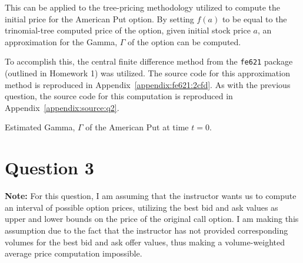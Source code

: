 \documentclass[10pt]{article}
\begin{document}
This can be applied to the tree-pricing methodology utilized to compute the initial price for the American Put option. By setting $f(a)$ to be equal to the trinomial-tree computed price of the option, given initial stock price $a$, an approximation for the Gamma, $\Gamma$ of the option can be computed.

To accomplish this, the central finite difference method from the \texttt{fe621} package (outlined in Homework 1) was utilized. The source code for this approximation method is reproduced in Appendix~\ref{appendix:fe621:2cfd}. As with the previous question, the source code for this computation is reproduced in Appendix~\ref{appendix:source:q2}.

\begin{table}[!h]
    \centering
    \caption{Estimated Gamma, $\Gamma$ of the American Put at time $t = 0$.}
    \label{table:q2_american_put_gamma}
\end{table}


\newpage
\section{Question 3}


\vspace{2em}

\textbf{Note:} For this question, I am assuming that the instructor wants us to compute an interval of possible option prices, utilizing the best bid and ask values as upper and lower bounds on the price of the original call option. I am making this assumption due to the fact that the instructor has not provided corresponding volumes for the best bid and ask offer values, thus making a volume-weighted average price computation impossible.
\end{document}
